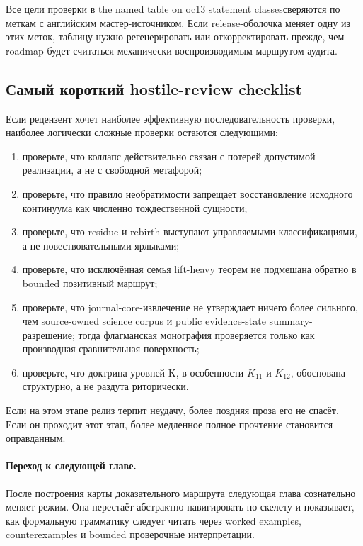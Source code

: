 Все цели проверки в the named table on oc13 statement classesсверяются по меткам с английским мастер-источником. Если release-оболочка меняет одну из этих меток, таблицу нужно регенерировать или откорректировать прежде, чем roadmap будет считаться механически воспроизводимым маршрутом аудита.

\subsection{Самый короткий hostile-review checklist}

Если рецензент хочет наиболее эффективную последовательность проверки, наиболее логически сложные проверки остаются следующими:

\begin{enumerate}
\item проверьте, что коллапс действительно связан с потерей допустимой реализации, а не с свободной метафорой;
\item проверьте, что правило необратимости запрещает восстановление исходного континуума как численно тождественной сущности;
\item проверьте, что residue и rebirth выступают управляемыми классификациями, а не повествовательными ярлыками;
\item проверьте, что исключённая семья lift-heavy теорем не подмешана обратно в bounded позитивный маршрут;
\item проверьте, что journal-core-извлечение не утверждает ничего более сильного, чем source-owned science corpus и public evidence-state summary-разрешение; тогда флагманская монография проверяется только как производная сравнительная поверхность;
\item проверьте, что доктрина уровней K, в особенности \(K_{11}\) и \(K_{12}\), обоснована структурно, а не раздута риторически.
\end{enumerate}

Если на этом этапе релиз терпит неудачу, более поздняя проза его не спасёт. Если он проходит этот этап, более медленное полное прочтение становится оправданным.

\paragraph{Переход к следующей главе.}
После построения карты доказательного маршрута следующая глава сознательно меняет режим. Она перестаёт абстрактно навигировать по скелету и показывает, как формальную грамматику следует читать через worked examples, counterexamples и bounded проверочные интерпретации.

\clearpage
